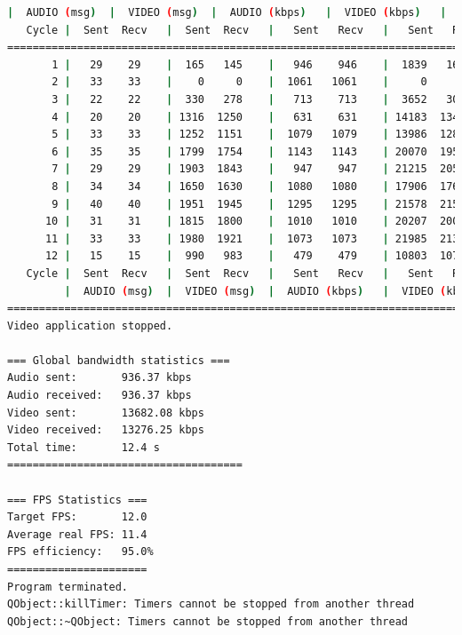 \begin{lstlisting}[language=bash,basicstyle=\ttfamily\tiny]
        |  AUDIO (msg)  |  VIDEO (msg)  |  AUDIO (kbps)   |  VIDEO (kbps)   |     CPU (%) 
   Cycle |  Sent  Recv   |  Sent  Recv   |   Sent   Recv   |   Sent   Recv   | Program System
================================================================================================
       1 |   29    29    |  165   145    |   946    946    |  1839   1618    |  28      0       
       2 |   33    33    |    0     0    |  1061   1061    |     0      0    |  50     76       
       3 |   22    22    |  330   278    |   713    713    |  3652   3076    |  40     77       
       4 |   20    20    | 1316  1250    |   631    631    | 14183  13473    |  24     77       
       5 |   33    33    | 1252  1151    |  1079   1079    | 13986  12859    |  36     73       
       6 |   35    35    | 1799  1754    |  1143   1143    | 20070  19567    |  41     74       
       7 |   29    29    | 1903  1843    |   947    947    | 21215  20550    |  40     69       
       8 |   34    34    | 1650  1630    |  1080   1080    | 17906  17695    |  31     72       
       9 |   40    40    | 1951  1945    |  1295   1295    | 21578  21512    |  46     68       
      10 |   31    31    | 1815  1800    |  1010   1010    | 20207  20042    |  46     73       
      11 |   33    33    | 1980  1921    |  1073   1073    | 21985  21331    |  44     70       
      12 |   15    15    |  990   983    |   479    479    | 10803  10728    |  17     51       
   Cycle |  Sent  Recv   |  Sent  Recv   |   Sent   Recv   |   Sent   Recv   | Program System
         |  AUDIO (msg)  |  VIDEO (msg)  |  AUDIO (kbps)   |  VIDEO (kbps)   |     CPU (%) 
===========================================================================================
Video application stopped.

=== Global bandwidth statistics ===
Audio sent:       936.37 kbps
Audio received:   936.37 kbps
Video sent:       13682.08 kbps
Video received:   13276.25 kbps
Total time:       12.4 s
=====================================

=== FPS Statistics ===
Target FPS:       12.0
Average real FPS: 11.4
FPS efficiency:   95.0%
======================
Program terminated.
QObject::killTimer: Timers cannot be stopped from another thread
QObject::~QObject: Timers cannot be stopped from another thread
\end{lstlisting}
\vspace{\baselineskip}

